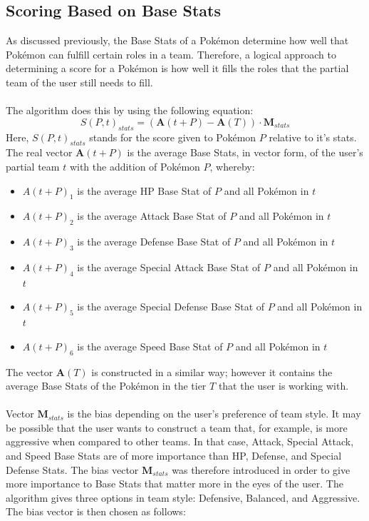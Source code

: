 \documentclass{article}
\begin{document}
\subsection{Scoring Based on Base Stats}\label{scoringBaseStats}
As discussed previously, the Base Stats of a Pok\'emon determine how well that Pok\'emon can fulfill certain roles in a team. Therefore, a logical approach to determining a score for a Pok\'emon is how well it fills the roles that the partial team of the user still needs to fill.\\\\
The algorithm does this by using the following equation:
\begin{equation}\label{statsScoreEqn}
	S(P,t)_{stats}=(\textbf{A}(t+P)-\textbf{A}(T))\cdot\textbf{M}_{stats}
\end{equation}
Here, $S(P,t)_{stats}$ stands for the score given to Pok\'emon $P$ relative to it's stats. The real vector $\textbf{A}(t+P)$ is the average Base Stats, in vector form, of the user's partial team $t$ with the addition of Pok\'emon $P$, whereby:
\begin{itemize}
\item $A(t+P)_1$ is the average HP Base Stat of $P$ and all Pok\'emon in $t$
\item $A(t+P)_2$ is the average Attack Base Stat of $P$ and all Pok\'emon in $t$
\item $A(t+P)_3$ is the average Defense Base Stat of $P$ and all Pok\'emon in $t$
\item $A(t+P)_4$ is the average Special Attack Base Stat of $P$ and all Pok\'emon in $t$
\item $A(t+P)_5$ is the average Special Defense Base Stat of $P$ and all Pok\'emon in $t$
\item $A(t+P)_6$ is the average Speed Base Stat of $P$ and all Pok\'emon in $t$
\end{itemize}
The vector $\textbf{A}(T)$ is constructed in a similar way; however it contains the average Base Stats of the Pok\'emon in the tier $T$ that the user is working with.\\\\
Vector $\textbf{M}_{stats}$ is the bias depending on the user's preference of team style. It may be possible that the user wants to construct a team that, for example, is more aggressive when compared to other teams. In that case, Attack, Special Attack, and Speed Base Stats are of more importance than HP, Defense, and Special Defense Stats. The bias vector $\textbf{M}_{stats}$ was therefore introduced in order to give more importance to Base Stats that matter more in the eyes of the user. The algorithm gives three options in team style: Defensive, Balanced, and Aggressive. The bias vector is then chosen as follows:
\end{document}
